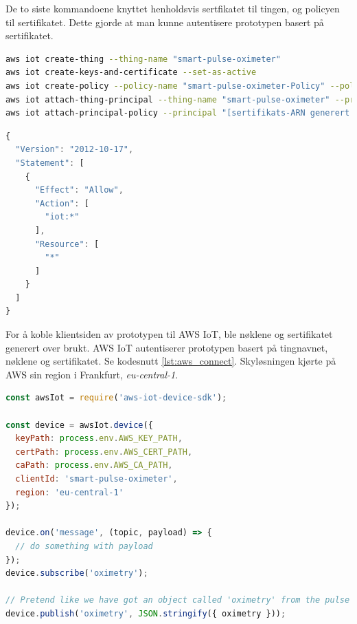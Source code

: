 De to siste kommandoene knyttet henholdsvis sertfikatet til tingen, og policyen til sertifikatet. Dette gjorde at man kunne autentisere prototypen
basert på sertifikatet.

\begin{lstlisting}[frame=single, language=bash, caption=Registrere en ting i AWS IoT, label=lst:aws_register]
aws iot create-thing --thing-name "smart-pulse-oximeter"
aws iot create-keys-and-certificate --set-as-active
aws iot create-policy --policy-name "smart-pulse-oximeter-Policy" --policy-document "file://policy.json"
aws iot attach-thing-principal --thing-name "smart-pulse-oximeter" --principal "[sertifikats-ARN generert paa linje 2]"
aws iot attach-principal-policy --principal "[sertifikats-ARN generert paa linje to]" --policy-name "smart-pulse-oximeter-Policy"
\end{lstlisting}

\begin{lstlisting}[language=JavaScript, frame=single,
    caption=Policy-dokument (policy.json), label=lst:aws_policy]
{
  "Version": "2012-10-17",
  "Statement": [
    {
      "Effect": "Allow",
      "Action": [
        "iot:*"
      ],
      "Resource": [
        "*"
      ]
    }
  ]
}
\end{lstlisting}

For å koble klientsiden av prototypen til AWS IoT, ble nøklene og sertifikatet generert over brukt.
AWS IoT autentiserer prototypen basert på tingnavnet, nøklene og sertifikatet.
Se kodesnutt \ref{lst:aws_connect}. Skyløsningen kjørte på AWS sin region i Frankfurt, \textit{eu-central-1}.
\begin{lstlisting}[language=JavaScript, frame=single,
    caption=Koble prototype til AWS IoT, label=lst:aws_connect]
const awsIot = require('aws-iot-device-sdk');

const device = awsIot.device({
  keyPath: process.env.AWS_KEY_PATH,
  certPath: process.env.AWS_CERT_PATH,
  caPath: process.env.AWS_CA_PATH,
  clientId: 'smart-pulse-oximeter',
  region: 'eu-central-1'
});

device.on('message', (topic, payload) => { 
  // do something with payload
});
device.subscribe('oximetry');

// Pretend like we have got an object called 'oximetry' from the pulse oximeter
device.publish('oximetry', JSON.stringify({ oximetry }));
\end{lstlisting}

